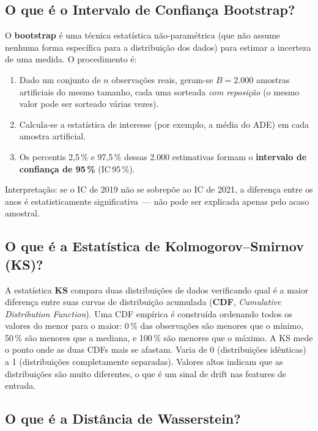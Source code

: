\documentclass[11pt,a4paper]{article}
\begin{document}
\subsection*{O que \'e o Intervalo de Confian\c{c}a Bootstrap?}

O \textbf{bootstrap} \'e uma t\'ecnica estat\'istica n\~ao-param\'etrica (que n\~ao assume nenhuma forma espec\'ifica para a distribui\c{c}\~ao dos dados) para estimar a incerteza de uma medida. O procedimento \'e:
\begin{enumerate}[leftmargin=1.4em,itemsep=2pt]
    \item Dado um conjunto de $n$ observa\c{c}\~oes reais, geram-se $B = 2{.}000$ amostras artificiais do mesmo tamanho, cada uma sorteada \emph{com reposi\c{c}\~ao} (o mesmo valor pode ser sorteado v\'arias vezes).
    \item Calcula-se a estat\'istica de interesse (por exemplo, a m\'edia do ADE) em cada amostra artificial.
    \item Os percentis 2{,}5\,\% e 97{,}5\,\% dessas 2.000 estimativas formam o \textbf{intervalo de confian\c{c}a de 95\,\%} (IC\,95\,\%).
\end{enumerate}
Interpreta\c{c}\~ao: se o IC de 2019 n\~ao se sobrep\~oe ao IC de 2021, a diferen\c{c}a entre os anos \'e estatisticamente significativa~--- n\~ao pode ser explicada apenas pelo acaso amostral.

\subsection*{O que \'e a Estat\'istica de Kolmogorov--Smirnov (KS)?}

A estat\'istica \textbf{KS} compara duas distribui\c{c}\~oes de dados verificando qual \'e a maior diferen\c{c}a entre suas curvas de distribui\c{c}\~ao acumulada (\textbf{CDF}, \emph{Cumulative Distribution Function}). Uma CDF empírica \'e constru\'ida ordenando todos os valores do menor para o maior: 0\,\% das observa\c{c}\~oes s\~ao menores que o m\'inimo, 50\,\% s\~ao menores que a mediana, e 100\,\% s\~ao menores que o m\'aximo. A KS mede o ponto onde as duas CDFs mais se afastam. Varia de 0 (distribui\c{c}\~oes id\^enticas) a 1 (distribui\c{c}\~oes completamente separadas). Valores altos indicam que as distribui\c{c}\~oes s\~ao muito diferentes, o que \'e um sinal de drift nas features de entrada.

\subsection*{O que \'e a Dist\^ancia de Wasserstein?}
\end{document}
